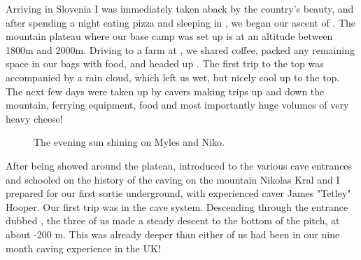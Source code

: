 Arriving in Slovenia I was immediately taken aback by the country's beauty, and after spending
a night eating pizza and sleeping in , we began our ascent of . The mountain plateau
where our base camp was set up is at an altitude between 1800m and 2000m. Driving to a farm at
, we shared coffee, packed any remaining space in our bags with food, and headed up .
The first trip to the top was accompanied by a rain cloud, which left us wet, but nicely cool up to the
top. The next few days were taken up by cavers making trips up and down the mountain, ferrying
equipment, food and most importantly huge volumes of very heavy cheese!


\begin{figure}[t!]
\checkoddpage \ifoddpage \forcerectofloat \else \forceversofloat \fi
{}
\caption{The evening sun shining on Myles and Niko. }
\end{figure}





After being showed around the plateau, introduced to the various cave entrances and schooled on
the history of the caving on the mountain Nikolas Kral and I prepared for our first sortie underground,
with experienced caver James "Tetley" Hooper. Our first trip was in the  cave system.
Descending through the entrance dubbed , the three of us made a steady descent to
the bottom of the  pitch, at about -200 m. This was already deeper than either of us had been
in our nine month caving experience in the UK!


